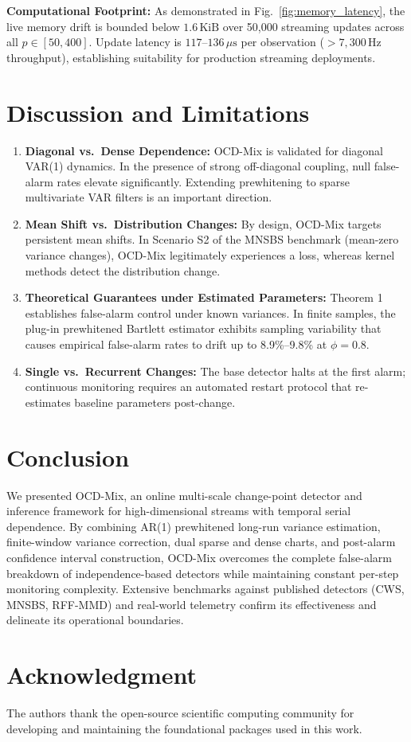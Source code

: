 \documentclass[lettersize,journal]{IEEEtran}
\begin{document}
\textbf{Computational Footprint:} As demonstrated in Fig.~\ref{fig:memory_latency}, the live memory drift is bounded below $1.6\,\text{KiB}$ over 50,000 streaming updates across all $p \in [50, 400]$. Update latency is $117$--$136\,\mu\text{s}$ per observation ($>7,300\,\text{Hz}$ throughput), establishing suitability for production streaming deployments.

\section{Discussion and Limitations}
\begin{enumerate}
    \item \textbf{Diagonal vs.\ Dense Dependence:} OCD-Mix is validated for diagonal VAR(1) dynamics. In the presence of strong off-diagonal coupling, null false-alarm rates elevate significantly. Extending prewhitening to sparse multivariate VAR filters is an important direction.
    \item \textbf{Mean Shift vs.\ Distribution Changes:} By design, OCD-Mix targets persistent mean shifts. In Scenario S2 of the MNSBS benchmark (mean-zero variance changes), OCD-Mix legitimately experiences a loss, whereas kernel methods detect the distribution change.
    \item \textbf{Theoretical Guarantees under Estimated Parameters:} Theorem 1 establishes false-alarm control under known variances. In finite samples, the plug-in prewhitened Bartlett estimator exhibits sampling variability that causes empirical false-alarm rates to drift up to 8.9\%--9.8\% at $\phi=0.8$.
    \item \textbf{Single vs.\ Recurrent Changes:} The base detector halts at the first alarm; continuous monitoring requires an automated restart protocol that re-estimates baseline parameters post-change.
\end{enumerate}

\section{Conclusion}
We presented OCD-Mix, an online multi-scale change-point detector and inference framework for high-dimensional streams with temporal serial dependence. By combining AR(1) prewhitened long-run variance estimation, finite-window variance correction, dual sparse and dense charts, and post-alarm confidence interval construction, OCD-Mix overcomes the complete false-alarm breakdown of independence-based detectors while maintaining constant per-step monitoring complexity. Extensive benchmarks against published detectors (CWS, MNSBS, RFF-MMD) and real-world telemetry confirm its effectiveness and delineate its operational boundaries.

\section*{Acknowledgment}
The authors thank the open-source scientific computing community for developing and maintaining the foundational packages used in this work.



\end{document}
